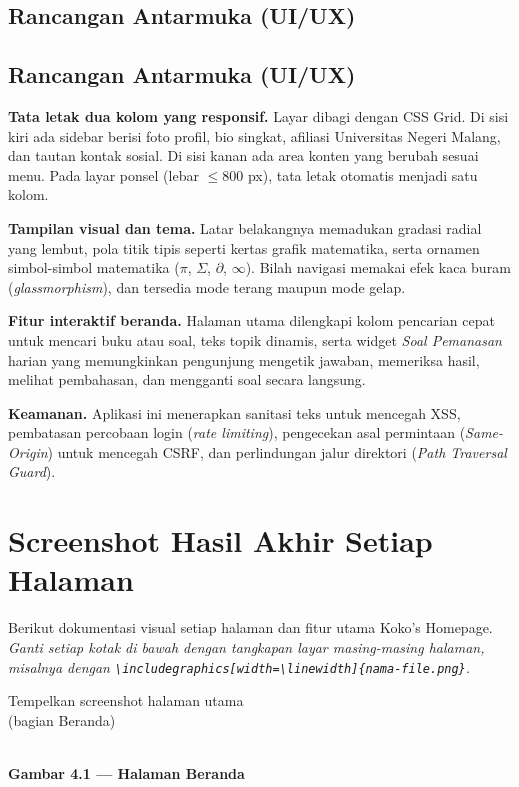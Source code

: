 \documentclass[12pt,a4paper]{article}
\newcommand{\captiongambar}{}
\newenvironment{kotakgambar}[1]{%
	\renewcommand{\captiongambar}{#1}%
	\begin{lrbox}{\kotakbox}%
		\begin{minipage}[c][5cm][c]{0.9\textwidth}%
			\centering\color{gray}\small
		}{%
		\end{minipage}%
	\end{lrbox}%
	\begin{center}
		\fbox{\usebox{\kotakbox}}\\[4pt]
		\small\textbf{\captiongambar}
	\end{center}
}
\begin{document}
	\subsection{Rancangan Antarmuka (UI/UX)}
	
	\subsection{Rancangan Antarmuka (UI/UX)}
	
	\textbf{Tata letak dua kolom yang responsif.} Layar dibagi dengan CSS Grid. Di sisi kiri ada sidebar berisi foto profil, bio singkat, afiliasi Universitas Negeri Malang, dan tautan kontak sosial. Di sisi kanan ada area konten yang berubah sesuai menu. Pada layar ponsel (lebar $\leq 800$ px), tata letak otomatis menjadi satu kolom.
	
	\textbf{Tampilan visual dan tema.} Latar belakangnya memadukan gradasi radial yang lembut, pola titik tipis seperti kertas grafik matematika, serta ornamen simbol-simbol matematika ($\pi$, $\Sigma$, $\partial$, $\infty$). Bilah navigasi memakai efek kaca buram (\textit{glassmorphism}), dan tersedia mode terang maupun mode gelap.
	
	\textbf{Fitur interaktif beranda.} Halaman utama dilengkapi kolom pencarian cepat untuk mencari buku atau soal, teks topik dinamis, serta widget \textit{Soal Pemanasan} harian yang memungkinkan pengunjung mengetik jawaban, memeriksa hasil, melihat pembahasan, dan mengganti soal secara langsung.
	
	\textbf{Keamanan.} Aplikasi ini menerapkan sanitasi teks untuk mencegah XSS, pembatasan percobaan login (\textit{rate limiting}), pengecekan asal permintaan (\textit{Same-Origin}) untuk mencegah CSRF, dan perlindungan jalur direktori (\textit{Path Traversal Guard}).
	
	\section{Screenshot Hasil Akhir Setiap Halaman}
	
	Berikut dokumentasi visual setiap halaman dan fitur utama Koko's Homepage. \textit{Ganti setiap kotak di bawah dengan tangkapan layar masing-masing halaman, misalnya dengan \texttt{\textbackslash includegraphics[width=\textbackslash linewidth]\{nama-file.png\}}.}
	
	\begin{kotakgambar}{Gambar 4.1 --- Halaman Beranda}
		Tempelkan screenshot halaman utama\\ (bagian Beranda)
	\end{kotakgambar}
	
\end{document}

